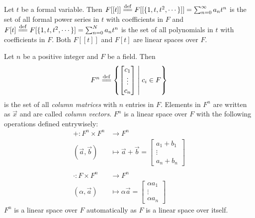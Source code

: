 \documentclass[
	11pt, %
	fleqn, %
	a4paper, %
]{LegrandOrangeBook}
\begin{document}
\begin{example}
    Let $t$ be a formal variable. Then $F[[t]] \overset{\mathrm{def}}{=\joinrel=} F[[\{ 1, t, t^2, \cdots \}]] = \sum_{n = 0}^{\infty} a_n t^n$ is the set of all formal power series in $t$ with coefficients in $F$ and $F[t] \overset{\mathrm{def}}{=\joinrel=} F[\{ 1, t, t^2, \cdots \}] = \sum_{n = 0}^{N} a_n t^n$ is the set of all polynomials in $t$ with coefficients in $F$. Both $F[[t]]$ and $F[t]$ are linear spaces over $F$.
\end{example}

\begin{example}
    Let $n$ be a positive integer and $F$ be a field. Then 
    \[
        F^n \overset{\mathrm{def}}{=\joinrel=} \left\{ 
        \begin{bmatrix}
        c_1 \\
        \vdots \\
        c_n
        \end{bmatrix}
        \;\middle|\; c_i \in F
        \right\}
    \]
    is the set of all \emph{column matrices} with $n$ entries in $F$. Elements in $F^n$ are written as $\vec{x}$ and are called \emph{column vectors}. $F^n$ is a linear space over $F$ with the following operations defined entrywisely:
    \[
        \begin{split}
            + : F^n \times F^n &\to F^n \\
            (\vec{a}, \vec{b}) &\mapsto \vec{a} + \vec{b} = \begin{bmatrix}
            a_1 + b_1 \\
            \vdots \\
            a_n + b_n
            \end{bmatrix} \\ \\
            \cdot : F \times F^n &\to F^n \\
            (\alpha, \vec{a}) &\mapsto \alpha \vec{a} = \begin{bmatrix}
            \alpha a_1 \\
            \vdots \\
            \alpha a_n
            \end{bmatrix}
        \end{split}
    \]
    $F^n$ is a linear space over $F$ automatically as $F$ is a linear space over itself.
\end{example}

\end{document}

